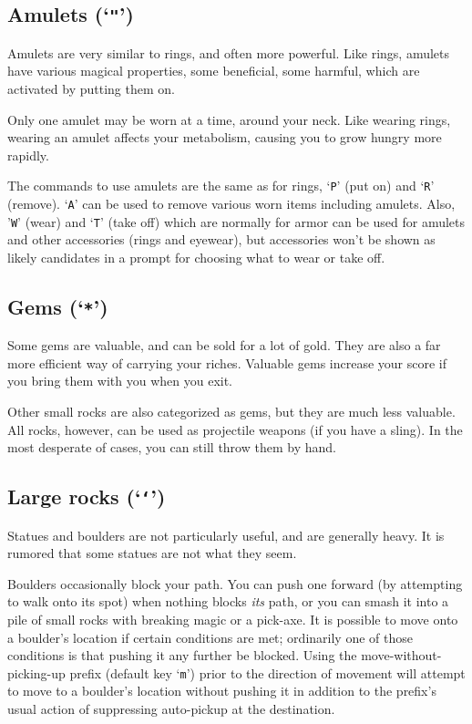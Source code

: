 \documentclass[titlepage]{article}
\begin{document}
\subsection*{Amulets (`\texttt{"}')}

Amulets are very similar to rings, and often more powerful.  Like
rings, amulets have various magical properties, some beneficial,
some harmful, which are activated by putting them on.

Only one amulet may be worn at a time, around your neck.
Like wearing rings, wearing an amulet affects your metabolism, causing
you to grow hungry more rapidly.

The commands to use amulets are the same as for rings, `\texttt{P}' (put on)
and `\texttt{R}' (remove).
`\texttt{A}' can be used to remove various worn items including amulets.
Also, '\texttt{W}' (wear) and `\texttt{T}' (take off) which are normally for
armor can be used for amulets and other accessories (rings and eyewear),
but accessories won't be shown as likely candidates in a prompt for
choosing what to wear or take off.

\subsection*{Gems (`\texttt{*}')}

Some gems are valuable, and can be sold for a lot of gold.
They are also a far more efficient way of carrying your riches.
Valuable gems increase your score if you bring them with you when you exit.

Other small rocks are also categorized as gems, but they are much less
valuable.
All rocks, however, can be used as projectile weapons (if you have a sling).
In the most desperate of cases, you can still throw them by hand.

\subsection*{Large rocks (`\texttt{`}')}
Statues and boulders are not particularly useful, and are generally heavy.
It is rumored that some statues are not what they seem.

Boulders occasionally block your path.
You can push one forward (by attempting to walk onto its spot)
when nothing blocks \textit{its} path, or you can
smash it into a pile of small rocks with breaking magic or a pick-axe.
It is possible to move onto a boulder's location if certain conditions
are met; ordinarily one of those conditions is that pushing it any
further be blocked.
Using the move-without-picking-up prefix (default key `\texttt{m}')
prior to the direction of movement will attempt to move to a boulder's
location without pushing it in addition to the prefix's usual action of
suppressing auto-pickup at the destination.
\end{document}
